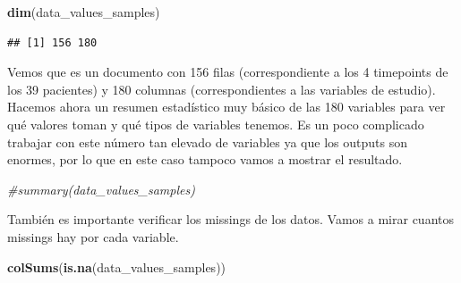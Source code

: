 \documentclass[
]{article}
\newenvironment{Shaded}{\begin{snugshade}}{\end{snugshade}}
\newcommand{\CommentTok}[1]{\textcolor[rgb]{0.56,0.35,0.01}{\textit{#1}}}
\newcommand{\FunctionTok}[1]{\textcolor[rgb]{0.13,0.29,0.53}{\textbf{#1}}}
\newcommand{\NormalTok}[1]{#1}
\begin{document}
\begin{Shaded}
\begin{Highlighting}[]
\FunctionTok{dim}\NormalTok{(data\_values\_samples)}
\end{Highlighting}
\end{Shaded}

\begin{verbatim}
## [1] 156 180
\end{verbatim}

Vemos que es un documento con 156 filas (correspondiente a los 4
timepoints de los 39 pacientes) y 180 columnas (correspondientes a las
variables de estudio). Hacemos ahora un resumen estadístico muy básico
de las 180 variables para ver qué valores toman y qué tipos de variables
tenemos. Es un poco complicado trabajar con este número tan elevado de
variables ya que los outputs son enormes, por lo que en este caso
tampoco vamos a mostrar el resultado.

\begin{Shaded}
\begin{Highlighting}[]
\CommentTok{\#summary(data\_values\_samples)}
\end{Highlighting}
\end{Shaded}

También es importante verificar los missings de los datos. Vamos a mirar
cuantos missings hay por cada variable.

\begin{Shaded}
\begin{Highlighting}[]
\FunctionTok{colSums}\NormalTok{(}\FunctionTok{is.na}\NormalTok{(data\_values\_samples))}
\end{Highlighting}
\end{Shaded}
\end{document}
